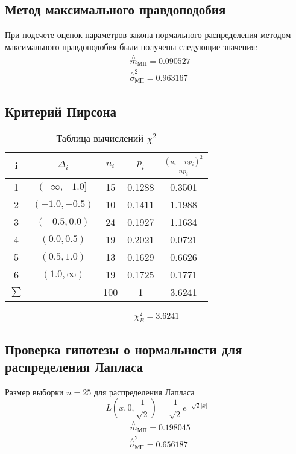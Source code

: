 \documentclass[a4]{article}
\begin{document}
\subsection{Метод максимального правдоподобия}

При подсчете оценок параметров закона нормального распределения методом максимального правдоподобия были получены следующие значения:
\begin{equation}
\begin{split}
    &\overset{\wedge}{m}_{\text{МП}} = 0.090527\\
   &  \overset{\wedge}{\sigma}^2_{\text{МП}} = 0.963167
\end{split}
\end{equation}
\subsection{Критерий Пирсона}
\begin{table}[H]
\caption{Таблица вычислений $\chi^2$}
\label{tab:my_label1}
\begin{center}
\vspace{5mm}
\begin{tabular}{|c|c|c|c|c|}
\hline
 i & $\Delta_i$ & $n_i$ & $p_i$ & $\frac{(n_i-np_i)^2}{np_i}$\\
\hline
1&	 $(-\infty, -1.0]$ &	15  &	 0.1288 &	 0.3501\\
\hline
2&	$(-1.0, -0.5)$&	10&	 0.1411&	  1.1988\\
\hline
3& $(-0.5, 0.0)$&	24&	 0.1927&	 1.1634\\
\hline
4&	$(0.0, 0.5)$&	19&	 0.2021&	 0.0721\\
\hline
5& $(0.5, 1.0)$&	13&	 0.1629&	 0.6626\\
\hline
6& $(1.0, \infty)$&	19&	 0.1725&	 0.1771\\
\hline
$\sum$&&		100&	1  & 3.6241	\\

\hline
\end{tabular}
\end{center}
\end{table}

$$\chi_B^2= 3.6241$$

\subsection{Проверка гипотезы о нормальности для распределения \newline  Лапласа}
Размер выборки $ n = 25 $ для распределения Лапласа
\begin{equation}\label{eqn:laplace}
L\left( x,0,\frac{1}{\sqrt{2}}\right) = \frac{1}{\sqrt{2}}e^{-\sqrt{2}\vert x\vert}
\end{equation}
  \begin{equation}
  \begin{split}
  &\overset{\wedge}{m}_{\text{МП}} = 0.198045\\
  &  \overset{\wedge}{\sigma}^2_{\text{МП}} = 0.656187
  \end{split}
  \end{equation}
\end{document}
